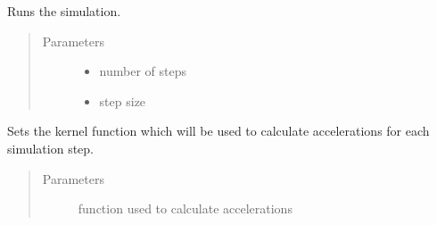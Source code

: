 \documentclass[letterpaper,10pt,english]{sphinxmanual}
\begin{document}
\begin{itemize}
\begin{fulllineitems}
\begin{fulllineitems}
\end{fulllineitems}


\begin{fulllineitems}
\label{\detokenize{simulator:nbody.simulator.simulation.SimulationBase.run}}
\sphinxAtStartPar
Runs the simulation.
\begin{quote}\begin{description}
\item[{Parameters}] \leavevmode\begin{itemize}
\item {} 
\sphinxAtStartPar
{} \textendash{} number of steps

\item {} 
\sphinxAtStartPar
{} \textendash{} step size

\end{itemize}

\end{description}\end{quote}

\end{fulllineitems}


\begin{fulllineitems}
\label{\detokenize{simulator:nbody.simulator.simulation.SimulationBase.set_kernel}}
\sphinxAtStartPar
Sets the kernel function which will be used to calculate accelerations for each simulation
step.
\begin{quote}\begin{description}
\item[{Parameters}] \leavevmode
\sphinxAtStartPar
{} \textendash{} function used to calculate accelerations

\end{description}\end{quote}


\end{fulllineitems}
\end{fulllineitems}
\end{itemize}
\end{document}
